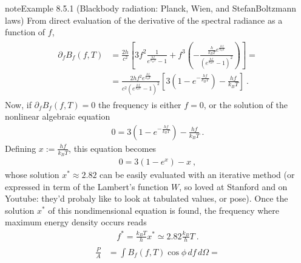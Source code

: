 \documentclass[letterpaper,10pt,english]{jupyterBook}
\begin{document}
\begin{sphinxadmonition}{note}{Example 8.5.1 (Black\sphinxhyphen{}body radiation: Planck, Wien, and Stefan\sphinxhyphen{}Boltzmann laws)}
\sphinxAtStartPar
From direct evaluation of the derivative of the spectral radiance as a function of \(f\),
\begin{equation*}
\begin{split}\begin{aligned}
  \partial_f B_{f}(f,T)
  & = \frac{2 h}{c^2} \left[ 3 f^2 \frac{1}{e^{\frac{hf}{k_B T}}-1} + f^3 \left(-\frac{\frac{h}{k_B T} e^{\frac{hf}{k_B T}}}{\left( e^{\frac{hf}{k_B T}} - 1 \right)^2}  \right) \right] = \\
  & = \frac{2 h f^2 e^{\frac{hf}{k_B T}}}{c^2 \left( e^{\frac{hf}{k_B T}} - 1 \right)^2} \left[ 3 \left( 1 - e^{-\frac{hf}{k_B T}} \right) - \frac{h f}{k_B T}  \right] \ .
\end{aligned}\end{split}
\end{equation*}
\sphinxAtStartPar
Now, if \(\partial_f B_{f}(f,T) = 0\) the frequency is either \(f = 0\), or the solution of the nonlinear algebraic equation
\begin{equation*}
\begin{split}0 = 3 \left(1 - e^{-\frac{h f}{k_B T}} \right) - \frac{hf}{k_B T} \ .\end{split}
\end{equation*}
\sphinxAtStartPar
Defining \(x := \frac{h f}{k_B T}\), this equation becomes
\begin{equation*}
\begin{split}0 = 3 (1 - e^x) - x \ ,\end{split}
\end{equation*}
\sphinxAtStartPar
whose solution \(x^* \approx 2.82\) can be easily evaluated with an iterative method (or expressed in term of the Lambert’s function \(W\), so loved at Stanford and on Youtube: they’d probaly like to look at tabulated values, or pose). Once the solution \(x^*\) of this non\sphinxhyphen{}dimensional equation is found, the frequency where maximum energy density occurs reads
\begin{equation*}
\begin{split}f^* = \frac{k_B T}{h} x^* \simeq 2.82 \frac{k_B}{h} T \ .\end{split}
\end{equation*}
\sphinxAtStartPar
{}
\begin{equation*}
\begin{split}\begin{aligned}
  \frac{P}{A} 
  & = \int B_{f}(f,T) \cos \phi \, df \, d\Omega = \\

\end{aligned}
\end{split}
\end{equation*}
\end{sphinxadmonition}
\end{document}
